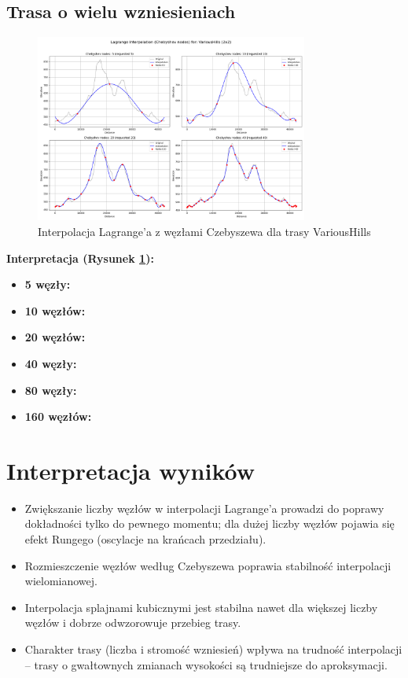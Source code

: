 \documentclass[11pt,a4paper]{article}
\begin{document}
\subsection{Trasa o wielu wzniesieniach}
\begin{figure}[H]
    \centering
    \includegraphics[width=0.8\textwidth]{plots/VariousHills_Lagrange_Chebyshev_2x2.png}
    \caption{Interpolacja Lagrange'a z węzłami Czebyszewa dla trasy VariousHills}
    \label{fig:wiele_wzniesien}
\end{figure}
\textbf{Interpretacja (Rysunek \ref{fig:wiele_wzniesien}):} 
\begin{itemize}
    \item \textbf{5 węzły:}
    \item \textbf{10 węzłów:}
    \item \textbf{20 węzłów:}
    \item \textbf{40 węzły:} 
    \item \textbf{80 węzły:} 
    \item \textbf{160 węzłów:} 
\end{itemize}

\newpage
\section{Interpretacja wyników}
\begin{itemize}
    \item Zwiększanie liczby węzłów w interpolacji Lagrange'a prowadzi do poprawy dokładności tylko do pewnego momentu; dla dużej liczby węzłów pojawia się efekt Rungego (oscylacje na krańcach przedziału).
    \item Rozmieszczenie węzłów według Czebyszewa poprawia stabilność interpolacji wielomianowej.
    \item Interpolacja splajnami kubicznymi jest stabilna nawet dla większej liczby węzłów i dobrze odwzorowuje przebieg trasy.
    \item Charakter trasy (liczba i stromość wzniesień) wpływa na trudność interpolacji -- trasy o gwałtownych zmianach wysokości są trudniejsze do aproksymacji.
\end{itemize}
\end{document}
